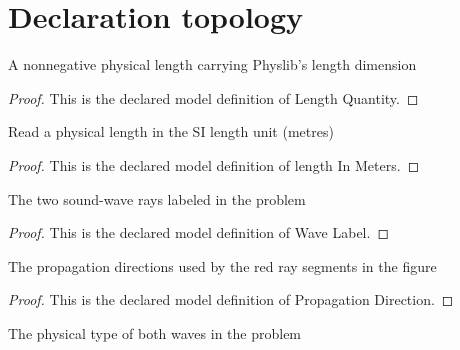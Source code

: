 \section{Declaration topology}
\begin{definition}
  \label{def:physics:phyx-mini-0311:phyxminiproblems-problemphyxmini0311-lengthquantity}
  A nonnegative physical length carrying Physlib's length dimension
\end{definition}
\begin{proof}
  This is the declared model definition of Length Quantity.
\end{proof}
\begin{definition}
  \label{def:physics:phyx-mini-0311:phyxminiproblems-problemphyxmini0311-lengthinmeters}
  Read a physical length in the SI length unit (metres)
\end{definition}
\begin{proof}
  This is the declared model definition of length In Meters.
\end{proof}
\begin{definition}
  \label{def:physics:phyx-mini-0311:phyxminiproblems-problemphyxmini0311-wavelabel}
  The two sound-wave rays labeled in the problem
\end{definition}
\begin{proof}
  This is the declared model definition of Wave Label.
\end{proof}
\begin{definition}
  \label{def:physics:phyx-mini-0311:phyxminiproblems-problemphyxmini0311-propagationdirection}
  The propagation directions used by the red ray segments in the figure
\end{definition}
\begin{proof}
  This is the declared model definition of Propagation Direction.
\end{proof}
\begin{definition}
  \label{def:physics:phyx-mini-0311:phyxminiproblems-problemphyxmini0311-acousticwavekind}
  The physical type of both waves in the problem
\end{definition}
